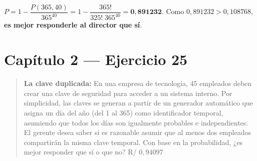 \documentclass[11pt]{article}
\begin{document}
\begin{resp}
$P=1-\dfrac{P(365,40)}{365^{40}}=1-\dfrac{365!}{325!\;365^{40}}=\mathbf{0{,}891232}$. Como $0{,}891232>0{,}108768$, \textbf{es mejor responderle al director que s\'i}.
\end{resp}

\section*{Cap\'itulo 2 --- Ejercicio 25}

\begin{quote}
\textbf{La clave duplicada:} En una empresa de tecnolog\'ia, 45 empleados deben crear una clave de seguridad para acceder a un sistema interno. Por simplicidad, las claves se generan a partir de un generador autom\'atico que asigna un d\'ia del a\~no (del 1 al 365) como identificador temporal, asumiendo que todos los d\'ias son igualmente probables e independientes. El gerente desea saber si es razonable asumir que al menos dos empleados compartir\'an la misma clave temporal. Con base en la probabilidad, ¿es mejor responder que s\'i o que no? \hfill R/ $0{,}94097$
\end{quote}
\end{document}
